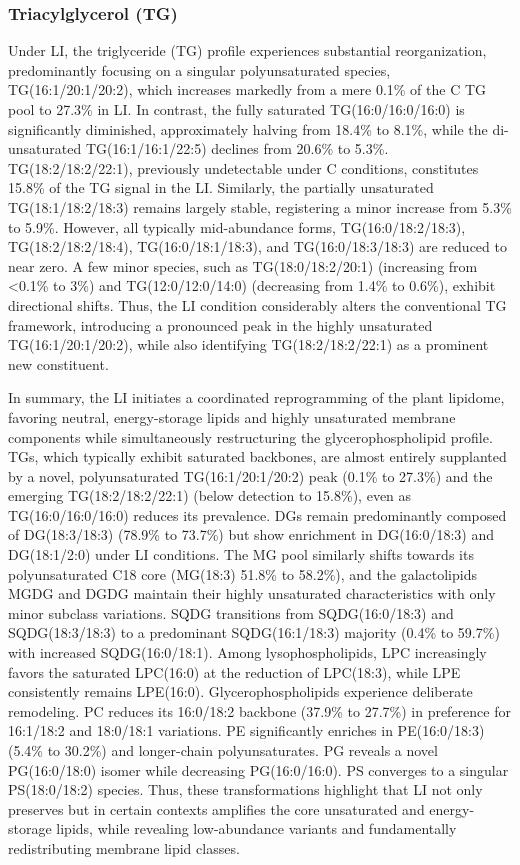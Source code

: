 \documentclass[10pt,letterpaper]{article}
\begin{document}
\begin{itemize}
\subsubsection*{Triacylglycerol (TG)} 
Under LI, the triglyceride (TG) profile experiences substantial reorganization, predominantly focusing on a singular polyunsaturated species, TG(16:1/20:1/20:2), which increases markedly from a mere 0.1\% of the C TG pool to 27.3\% in LI. In contrast, the fully saturated TG(16:0/16:0/16:0) is significantly diminished, approximately halving from 18.4\% to 8.1\%, while the di-unsaturated TG(16:1/16:1/22:5) declines from 20.6\% to 5.3\%. TG(18:2/18:2/22:1), previously undetectable under C conditions, constitutes 15.8\% of the TG signal in the LI. Similarly, the partially unsaturated TG(18:1/18:2/18:3) remains largely stable, registering a minor increase from 5.3\% to 5.9\%. However, all typically mid-abundance forms, TG(16:0/18:2/18:3), TG(18:2/18:2/18:4), TG(16:0/18:1/18:3), and TG(16:0/18:3/18:3) are reduced to near zero. A few minor species, such as TG(18:0/18:2/20:1) (increasing from \textless0.1\% to 3\%) and TG(12:0/12:0/14:0) (decreasing from 1.4\% to 0.6\%), exhibit directional shifts. Thus, the LI condition considerably alters the conventional TG framework, introducing a pronounced peak in the highly unsaturated TG(16:1/20:1/20:2), while also identifying TG(18:2/18:2/22:1) as a prominent new constituent.

\bigskip
In summary, the LI initiates a coordinated reprogramming of the plant lipidome, favoring neutral, energy-storage lipids and highly unsaturated membrane components while simultaneously restructuring the glycerophospholipid profile. TGs, which typically exhibit saturated backbones, are almost entirely supplanted by a novel, polyunsaturated TG(16:1/20:1/20:2) peak (0.1\% to 27.3\%) and the emerging TG(18:2/18:2/22:1) (below detection to 15.8\%), even as TG(16:0/16:0/16:0) reduces its prevalence. DGs remain predominantly composed of DG(18:3/18:3) (78.9\% to 73.7\%) but show enrichment in DG(16:0/18:3) and DG(18:1/2:0) under LI conditions. The MG pool similarly shifts towards its polyunsaturated C18 core (MG(18:3) 51.8\% to 58.2\%), and the galactolipids MGDG and DGDG maintain their highly unsaturated characteristics with only minor subclass variations. SQDG transitions from SQDG(16:0/18:3) and SQDG(18:3/18:3) to a predominant SQDG(16:1/18:3) majority (0.4\% to 59.7\%) with increased SQDG(16:0/18:1). Among lysophospholipids, LPC increasingly favors the saturated LPC(16:0) at the reduction of LPC(18:3), while LPE consistently remains LPE(16:0). Glycerophospholipids experience deliberate remodeling. PC reduces its 16:0/18:2 backbone (37.9\% to 27.7\%) in preference for 16:1/18:2 and 18:0/18:1 variations. PE significantly enriches in PE(16:0/18:3) (5.4\% to 30.2\%) and longer-chain polyunsaturates. PG reveals a novel PG(16:0/18:0) isomer while decreasing PG(16:0/16:0). PS converges to a singular PS(18:0/18:2) species. Thus, these transformations highlight that LI not only preserves but in certain contexts amplifies the core unsaturated and energy-storage lipids, while revealing low-abundance variants and fundamentally redistributing membrane lipid classes.


\end{itemize}
\end{document}
